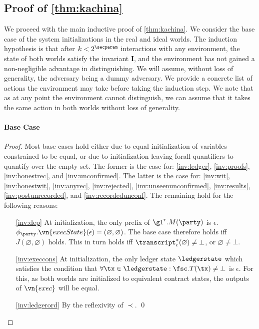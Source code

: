 \subsection{Proof of \autoref{thm:kachina}}
\label{sec:proof}

We proceed with the main inductive proof of \autoref{thm:kachina}. We consider
the base case of the system initializations in the real and ideal worlds. The
induction hypothesis is that after $k < 2^\secparam$ interactions with any
environment, the state of both worlds satisfy the invariant $\boldsymbol I$, and
the environment has not gained a non-negligible advantage in distinguishing. We
will assume, without loss of generality, the adversary being a dummy adversary.
We provide a concrete list of actions the environment may take before taking the
induction step. We note that as at any point the environment cannot distinguish,
we can assume that it takes the same action in both worlds without loss of
generality.

\paragraph{Base Case}

\begin{proof}
  Most base cases hold either due to equal initialization of variables
  constrained to be equal, or due to initialization leaving forall quantifiers
  to quantify over the empty set. The former is the case for:
  \ref{inv:ledger}, \ref{inv:proofs}, \ref{inv:honestrec}, and
  \ref{inv:unconfirmed}. The latter is the case for: \ref{inv:wit},
  \ref{inv:honestwit}, \ref{inv:anyrec}, \ref{inv:rejected},
  \ref{inv:unseenunconfirmed}, \ref{inv:results},
  \ref{inv:postunrecorded}, and \ref{inv:recordedunconf}. The remaining hold
  for the following reasons:

  \begin{enumerate}
  \item[\ref{inv:dep}] \sloppy At initialization, the only prefix of $\gl^r.M(\party)$
    is $\epsilon$. $\phi_\party.\vn{execState}(\epsilon) = (\varnothing,
    \varnothing)$. The base case therefore holds iff $J(\varnothing,
    \varnothing)$ holds. This in turn holds iff
    $\transcript^*_\epsilon(\varnothing) \neq \bot$, or $\varnothing \neq \bot$.
  \item[\ref{inv:execcons}] \fussy At initialization, the only ledger state
    $\ledgerstate$ which satisfies the condition that $\forall \tx \in
    \ledgerstate : \fsc.T(\tx) \neq \bot$ is $\epsilon$. For
    this, as both worlds are initialized to equivalent contract states, the
    outputs of $\vn{exec}$ will be equal.
  \item[\ref{inv:ledgerord}] By the reflexivity of $\prec$.
  \qed
  \end{enumerate}
\end{proof}

